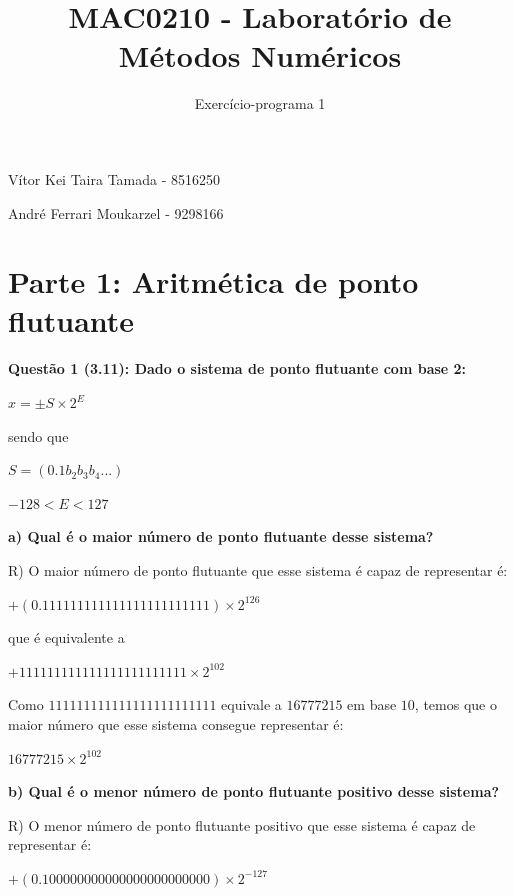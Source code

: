 \documentclass{article}
\title{MAC0210 - Laboratório de Métodos Numéricos}
\author{Exercício-programa 1}
\date{ }
\begin{document}
\maketitle

\begin{center}
\large{Vítor Kei Taira Tamada - 8516250}

\large{André Ferrari Moukarzel - 9298166}
\end{center}

\section{Parte 1: Aritmética de ponto flutuante}

\textbf{Questão 1 (3.11): Dado o sistema de ponto flutuante com base 2:}
\begin{center}
$x = \pm S \times 2^{E}$

sendo que

$S = (0.1b_{2}b_{3}b_{4}...)$

$-128 < E < 127$
\end{center}

\quad\textbf{a) Qual é o maior número de ponto flutuante desse sistema?}

\bigskip
\qquad R) O maior número de ponto flutuante que esse sistema é capaz de representar é:
\begin{center}
$+(0.111111111111111111111111) \times 2^{126}$
\end{center}

\qquad que é equivalente a

\begin{center}
$+111111111111111111111111 \times 2^{102}$
\end{center}

\qquad Como $111111111111111111111111$ equivale a $16777215$ em base $10$, temos que o maior número que esse sistema consegue representar é:

\begin{center}
$16777215 \times 2^{102}$
\end{center}

\quad\textbf{b) Qual é o menor número de ponto flutuante positivo desse sistema?}

\bigskip
\qquad R) O menor número de ponto flutuante positivo que esse sistema é capaz de representar é:

\begin{center}
$+(0.100000000000000000000000) \times 2^{-127}$
\end{center}
\end{document}
